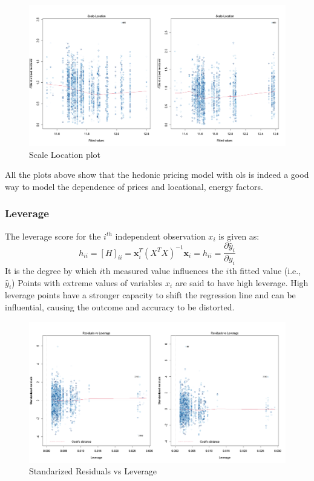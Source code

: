 \documentclass[12pt]{article}
\begin{document}
\begin{figure}[H]
    \centering
    \includegraphics[width=18cm]{3.3 images/3.3.3plot.png}
    \caption{Scale Location plot}
    \label{fig:scale}
\end{figure}

All the plots above show that the hedonic pricing model with \acrshort{ols} is indeed a good way to model the dependence of prices and locational, energy factors.

\subsubsection{Leverage}
The leverage score for the $i^{th}$ independent observation $x_i$ is given as:
$$h_{ii}=[H]_{ii}=\textbf{x}_i^T(X^TX)^{-1}\textbf{x}_i=h_{ii}=\frac{\partial \hat y_i}{\partial y_i}$$
It is the degree by which $i$th measured value influences the $i$th fitted value (i.e., $\hat y_i$)
Points with extreme values of variables $x_i$ are said to have high leverage. High leverage points have a stronger capacity to shift the regression line and can be influential, causing the outcome and accuracy to be distorted.

\begin{figure}[H]
    \centering
    \includegraphics[width=18cm]{3.3 images/3.3.4.png}
    \caption{Standarized Residuals vs Leverage}
    \label{fig:lev}
\end{figure}
\end{document}
